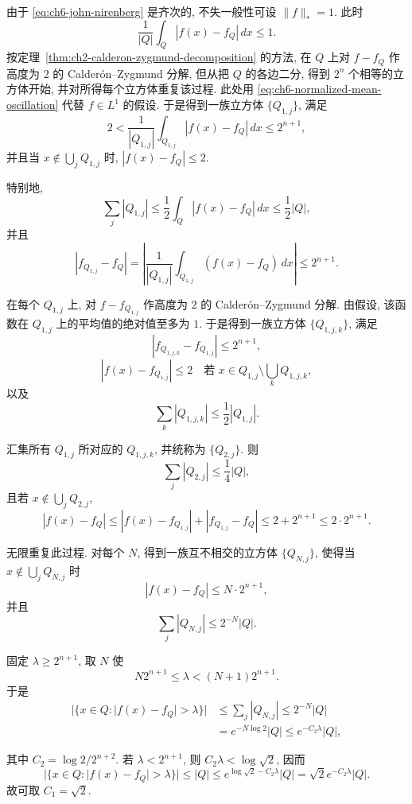 \begin{Proof}
由于 \eqref{eq:ch6-john-nirenberg} 是齐次的, 不失一般性可设 $\|f\|_*=1$. 此时
\begin{equation}
\label{eq:ch6-normalized-mean-oscillation}
 \frac1{|Q|}\int_Q|f(x)-f_Q|\,dx\le1.
\end{equation}
按定理~\ref{thm:ch2-calderon-zygmund-decomposition} 的方法, 在 $Q$ 上对 $f-f_Q$ 作高度为 $2$ 的 Calderón--Zygmund 分解, 但从把 $Q$ 的各边二分, 得到 $2^n$ 个相等的立方体开始, 并对所得每个立方体重复该过程. 此处用 \eqref{eq:ch6-normalized-mean-oscillation} 代替 $f\in L^1$ 的假设. 于是得到一族立方体 $\{Q_{1,j}\}$, 满足
\[
 2<\frac1{|Q_{1,j}|}\int_{Q_{1,j}}|f(x)-f_Q|\,dx\le2^{n+1},
\]
并且当 $x\notin\bigcup_jQ_{1,j}$ 时, $|f(x)-f_Q|\le2$.

\hypertarget{chapter-06-page-136}{}
特别地,
\[
 \sum_j|Q_{1,j}|
 \le\frac12\int_Q|f(x)-f_Q|\,dx
 \le\frac12|Q|,
\]
并且
\[
 |f_{Q_{1,j}}-f_Q|
 =\left|\frac1{|Q_{1,j}|}\int_{Q_{1,j}}(f(x)-f_Q)\,dx\right|
 \le2^{n+1}.
\]

在每个 $Q_{1,j}$ 上, 对 $f-f_{Q_{1,j}}$ 作高度为 $2$ 的 Calderón--Zygmund 分解. 由假设, 该函数在 $Q_{1,j}$ 上的平均值的绝对值至多为 $1$. 于是得到一族立方体 $\{Q_{1,j,k}\}$, 满足
\[
 |f_{Q_{1,j,k}}-f_{Q_{1,j}}|\le2^{n+1},
\]
\[
 |f(x)-f_{Q_{1,j}}|\le2
 \quad\text{若 }x\in Q_{1,j}\setminus\bigcup_kQ_{1,j,k},
\]
以及
\[
 \sum_k|Q_{1,j,k}|\le\frac12|Q_{1,j}|.
\]

汇集所有 $Q_{1,j}$ 所对应的 $Q_{1,j,k}$, 并统称为 $\{Q_{2,j}\}$. 则
\[
 \sum_j|Q_{2,j}|\le\frac14|Q|,
\]
且若 $x\notin\bigcup_jQ_{2,j}$,
\[
 |f(x)-f_Q|
 \le|f(x)-f_{Q_{1,j}}|+|f_{Q_{1,j}}-f_Q|
 \le2+2^{n+1}\le2\cdot2^{n+1}.
\]

无限重复此过程. 对每个 $N$, 得到一族互不相交的立方体 $\{Q_{N,j}\}$, 使得当 $x\notin\bigcup_jQ_{N,j}$ 时
\[
 |f(x)-f_Q|\le N\cdot2^{n+1},
\]
并且
\[
 \sum_j|Q_{N,j}|\le2^{-N}|Q|.
\]

固定 $\lambda\ge2^{n+1}$, 取 $N$ 使
\[
 N2^{n+1}\le\lambda<(N+1)2^{n+1}.
\]
于是
\[
\begin{aligned}
 |\{x\in Q:|f(x)-f_Q|>\lambda\}|
 &\le\sum_j|Q_{N,j}|\le2^{-N}|Q|\\
 &=e^{-N\log2}|Q|\le e^{-C_2\lambda}|Q|,
\end{aligned}
\]

\hypertarget{chapter-06-page-137}{}
其中 $C_2=\log2/2^{n+2}$. 若 $\lambda<2^{n+1}$, 则 $C_2\lambda<\log\sqrt2$, 因而
\[
 |\{x\in Q:|f(x)-f_Q|>\lambda\}|
 \le|Q|\le e^{\log\sqrt2-C_2\lambda}|Q|
 =\sqrt2e^{-C_2\lambda}|Q|.
\]
故可取 $C_1=\sqrt2$.
\end{Proof}

